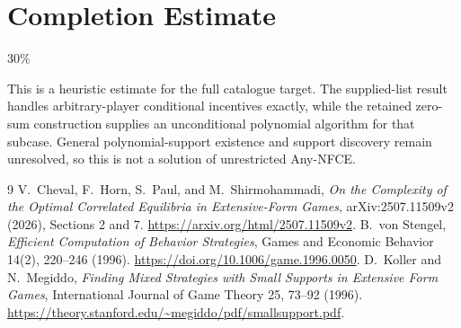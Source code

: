 \documentclass[11pt]{article}
\theoremstyle{definition}
\begin{document}
\section{Completion Estimate}
30\%

This is a heuristic estimate for the full catalogue target.
The supplied-list result handles arbitrary-player conditional incentives exactly,
while the retained zero-sum construction supplies an unconditional polynomial
algorithm for that subcase. General polynomial-support existence and support
discovery remain unresolved, so this is not a solution of unrestricted Any-NFCE.

\begin{thebibliography}{9}
 V.~Cheval, F.~Horn, S.~Paul, and M.~Shirmohammadi,
\emph{On the Complexity of the Optimal Correlated Equilibria in Extensive-Form
Games}, arXiv:2507.11509v2 (2026), Sections 2 and 7.
\url{https://arxiv.org/html/2507.11509v2}.
 B.~von Stengel, \emph{Efficient Computation of Behavior
Strategies}, Games and Economic Behavior 14(2), 220--246 (1996).
\url{https://doi.org/10.1006/game.1996.0050}.
 D.~Koller and N.~Megiddo, \emph{Finding Mixed Strategies
with Small Supports in Extensive Form Games}, International Journal of Game
Theory 25, 73--92 (1996).
\url{https://theory.stanford.edu/~megiddo/pdf/smallsupport.pdf}.
\end{thebibliography}
\end{document}
